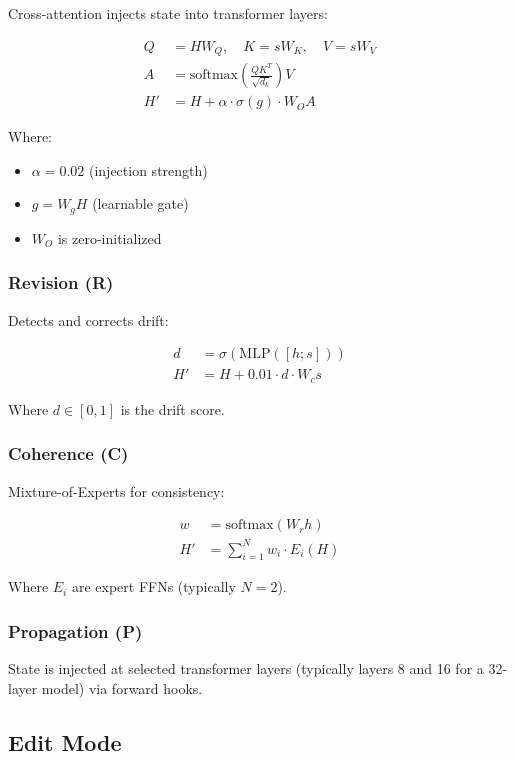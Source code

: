 \documentclass[11pt,a4paper]{article}
\begin{document}
Cross-attention injects state into transformer layers:

\begin{align}
    Q &= H W_Q, \quad K = s W_K, \quad V = s W_V \\
    A &= \text{softmax}\left(\frac{QK^T}{\sqrt{d_k}}\right) V \\
    H' &= H + \alpha \cdot \sigma(g) \cdot W_O A
\end{align}

Where:
\begin{itemize}
    \item $\alpha = 0.02$ (injection strength)
    \item $g = W_g H$ (learnable gate)
    \item $W_O$ is zero-initialized
\end{itemize}

\subsubsection{Revision (R)}

Detects and corrects drift:

\begin{align}
    d &= \sigma(\text{MLP}([h; s])) \\
    H' &= H + 0.01 \cdot d \cdot W_c s
\end{align}

Where $d \in [0,1]$ is the drift score.

\subsubsection{Coherence (C)}

Mixture-of-Experts for consistency:

\begin{align}
    w &= \text{softmax}(W_r h) \\
    H' &= \sum_{i=1}^{N} w_i \cdot E_i(H)
\end{align}

Where $E_i$ are expert FFNs (typically $N=2$).

\subsubsection{Propagation (P)}

State is injected at selected transformer layers (typically layers 8 and 16 for a 32-layer model) via forward hooks.

\subsection{Edit Mode}
\end{document}
